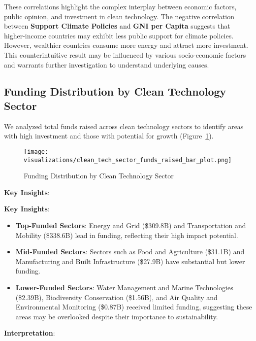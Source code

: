 \documentclass[sigconf]{acmart}
\begin{document}
These correlations highlight the complex interplay between economic factors, public opinion, and investment in clean technology. The negative correlation between \textbf{Support Climate Policies} and \textbf{GNI per Capita} suggests that higher-income countries may exhibit less public support for climate policies. However, wealthier countries consume more energy and attract more investment. This counterintuitive result may be influenced by various socio-economic factors and warrants further investigation to understand underlying causes.

\subsection{Funding Distribution by Clean Technology Sector}

We analyzed total funds raised across clean technology sectors to identify areas with high investment and those with potential for growth (Figure~\ref{fig:sector_funds_raised}).

\begin{figure}[htpb]
    \centering
    \texttt{[image: visualizations/clean\_tech\_sector\_funds\_raised\_bar\_plot.png]}
    \caption{Funding Distribution by Clean Technology Sector}
    \label{fig:sector_funds_raised}
\end{figure}

\textbf{Key Insights}:

\textbf{Key Insights}:

\begin{itemize}
    \item \textbf{Top-Funded Sectors}: Energy and Grid (\$309.8B) and Transportation and Mobility (\$338.6B) lead in funding, reflecting their high impact potential.
    \item \textbf{Mid-Funded Sectors}: Sectors such as Food and Agriculture (\$31.1B) and Manufacturing and Built Infrastructure (\$27.9B) have substantial but lower funding.
    \item \textbf{Lower-Funded Sectors}: Water Management and Marine Technologies (\$2.39B), Biodiversity Conservation (\$1.56B), and Air Quality and Environmental Monitoring (\$0.87B) received limited funding, suggesting these areas may be overlooked despite their importance to sustainability.
\end{itemize}

\textbf{Interpretation}:
\end{document}
